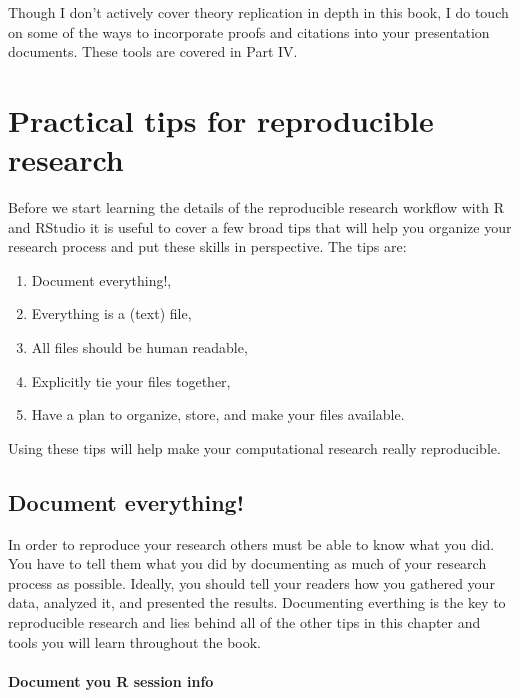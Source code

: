 {Though I don't actively cover theory replication in depth in this book, I do touch on some of the ways to incorporate proofs and citations into your presentation documents. These tools are covered in Part IV.

\section{Practical tips for reproducible research}

Before we start learning the details of the reproducible research workflow with R and RStudio it is useful to cover a few broad tips that will help you organize your research process and put these skills in perspective. The tips are:

\begin{enumerate}
    \item Document everything!,
    \item Everything is a (text) file,
    \item All files should be human readable,
    \item Explicitly tie your files together,
    \item Have a plan to organize, store, and make your files available.    
\end{enumerate}

\noindent Using these tips will help make your computational research really reproducible.

\subsection{Document everything!}

In order to reproduce your research others must be able to know what you did. You have to tell them what you did by documenting as much of your research process as possible. Ideally, you should tell your readers how you gathered your data, analyzed it, and presented the results. Documenting everthing is the key to reproducible research and lies behind all of the other tips in this chapter and tools you will learn throughout the book.

\paragraph{Document you R session info}

}

